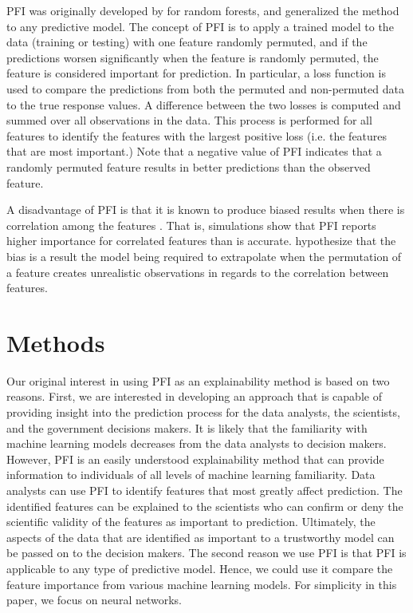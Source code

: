 \documentclass[letterpaper]{article}
\begin{document}
PFI was originally developed by \citeauthor{breiman:2001}  for random forests, and \citeauthor{fisher:2019}  generalized the method to any predictive model. The concept of PFI is to apply a trained model to the data (training or testing) with one feature randomly permuted, and if the predictions worsen significantly when the feature is randomly permuted, the feature is considered important for prediction. In particular, a loss function is used to compare the predictions from both the permuted and non-permuted data to the true response values. A difference between the two losses is computed and summed over all observations in the data. This process is performed for all features to identify the features with the largest positive loss (i.e. the features that are most important.) Note that a negative value of PFI indicates that a randomly permuted feature results in better predictions than the observed feature.

A disadvantage of PFI is that it is known to produce biased results when there is correlation among the features \cite{hooker:2019,nicodemus:2010,strobl:2007}. That is, simulations show that PFI reports higher importance for correlated features than is accurate. \citeauthor{hooker:2019}  hypothesize that the bias is a result the model being required to extrapolate when the permutation of a feature creates unrealistic observations in regards to the correlation between features.

\section{Methods} \label{methods}

Our original interest in using PFI as an explainability method is based on two reasons. First, we are interested in developing an approach that is capable of providing insight into the prediction process for the data analysts, the scientists, and the government decisions makers. It is likely that the familiarity with machine learning models decreases from the data analysts to decision makers. However, PFI is an easily understood explainability method that can provide information to individuals of all levels of machine learning familiarity. Data analysts can use PFI to identify features that most greatly affect prediction. The identified features can be explained to the scientists who can confirm or deny the scientific validity of the features as important to prediction. Ultimately, the aspects of the data that are identified as important to a trustworthy model can be passed on to the decision makers. The second reason we use PFI is that PFI is applicable to any type of predictive model. Hence, we could use it compare the feature importance from various machine learning models. For simplicity in this paper, we focus on neural networks.
\end{document}

